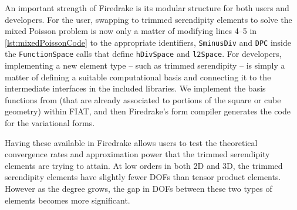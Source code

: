 \documentclass[format=acmsmall,screen,timestamp=false,a4paper]{acmart}
\begin{document}
  
  
An important strength of Firedrake is its modular structure for both users and developers.
For the user, swapping to trimmed serendipity elements to solve the mixed Poisson problem is now only a matter of modifying lines 4--5 in \cref{lst:mixedPoissonCode} to the appropriate identifiers, \texttt{SminusDiv} and \texttt{DPC} inside the \texttt{FunctionSpace} calls that define \texttt{hDivSpace} and \texttt{l2Space}.
   For developers, implementing a new element type -- such as trimmed serendipity -- is simply a matter of defining a suitable computational basis and connecting it to the intermediate interfaces in the included libraries.  We implement the basis functions from \citet{gillette2019computational} (that are already associated to portions of the square or cube geometry) within FIAT, and then Firedrake's form compiler generates the code for the variational forms.
   
   Having these available in Firedrake allows users to test the theoretical convergence rates and approximation power that the trimmed serendipity elements are trying to attain. 
   At low orders in both 2D and 3D, the trimmed serendipity elements have slightly fewer DOFs than tensor product elements.  However as the degree grows, the gap in DOFs between these two types of elements becomes more significant.
   
\end{document}
